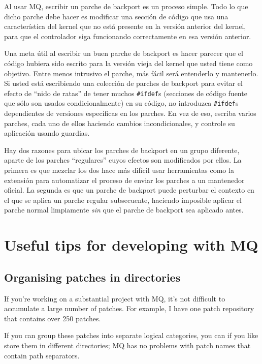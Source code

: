 Al usar MQ, escribir un parche de backport es un proceso simple. Todo
lo que dicho parche debe hacer es modificar una sección de código que
usa una característica del kernel que no está presente en la versión
anterior del kernel, para que el controlador siga funcionando
correctamente en esa versión anterior.

Una meta útil al escribir un buen parche de backport es hacer parecer
que el código hubiera sido escrito para la versión vieja del kernel
que usted tiene como objetivo. Entre menos intrusivo el parche, más
fácil será entenderlo y mantenerlo. Si usted está escribiendo una
colección de parches de backport para evitar el efecto de ``nido de
ratas'' de tener muchos \texttt{\#ifdef}s (secciones de código fuente
que sólo son usados condicionalmente) en su código, no introduzca
\texttt{\#ifdef}s dependientes de versiones específicas en los
parches. En vez de eso, escriba varios parches, cada uno de ellos
haciendo cambios incondicionales, y controle su aplicación usando
guardias.

Hay dos razones para ubicar los parches de backport en un grupo
diferente, aparte de los parches ``regulares'' cuyos efectos son
modificados por ellos. La primera es que mezclar los dos hace más
difícil usar herramientas como la extensión  para
automatizar el proceso de enviar los parches a un mantenedor oficial.
La segunda es que un parche de backport puede perturbar el contexto en
el que se aplica un parche regular subsecuente, haciendo imposible
aplicar el parche normal limpiamente \emph{sin} que el parche de
backport sea aplicado antes.

\section{Useful tips for developing with MQ}

\subsection{Organising patches in directories}

If you're working on a substantial project with MQ, it's not difficult
to accumulate a large number of patches.  For example, I have one
patch repository that contains over 250 patches.

If you can group these patches into separate logical categories, you
can if you like store them in different directories; MQ has no
problems with patch names that contain path separators.

